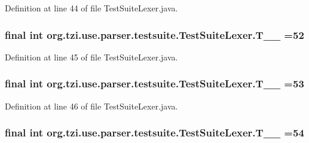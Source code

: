 Definition at line 44 of file Test\-Suite\-Lexer.\-java.

\hypertarget{classorg_1_1tzi_1_1use_1_1parser_1_1testsuite_1_1_test_suite_lexer_a5c9d36594806842d4b5cd9e8eb81f280}{
\subsubsection[{T\-\_\-\-\_\-52}]{\setlength{\rightskip}{0pt plus 5cm}final int org.\-tzi.\-use.\-parser.\-testsuite.\-Test\-Suite\-Lexer.\-T\-\_\-\-\_ =52\hspace{0.3cm}{\ttfamily [static]}}}\label{classorg_1_1tzi_1_1use_1_1parser_1_1testsuite_1_1_test_suite_lexer_a5c9d36594806842d4b5cd9e8eb81f280}


Definition at line 45 of file Test\-Suite\-Lexer.\-java.

\hypertarget{classorg_1_1tzi_1_1use_1_1parser_1_1testsuite_1_1_test_suite_lexer_a2456acf93faa5343583386230d8e002f}{
\subsubsection[{T\-\_\-\-\_\-53}]{\setlength{\rightskip}{0pt plus 5cm}final int org.\-tzi.\-use.\-parser.\-testsuite.\-Test\-Suite\-Lexer.\-T\-\_\-\-\_ =53\hspace{0.3cm}{\ttfamily [static]}}}\label{classorg_1_1tzi_1_1use_1_1parser_1_1testsuite_1_1_test_suite_lexer_a2456acf93faa5343583386230d8e002f}


Definition at line 46 of file Test\-Suite\-Lexer.\-java.

\hypertarget{classorg_1_1tzi_1_1use_1_1parser_1_1testsuite_1_1_test_suite_lexer_a6c77c978c88e20bfd6eb0b6ae324314b}{
\subsubsection[{T\-\_\-\-\_\-54}]{\setlength{\rightskip}{0pt plus 5cm}final int org.\-tzi.\-use.\-parser.\-testsuite.\-Test\-Suite\-Lexer.\-T\-\_\-\-\_ =54\hspace{0.3cm}{\ttfamily [static]}}}\label{classorg_1_1tzi_1_1use_1_1parser_1_1testsuite_1_1_test_suite_lexer_a6c77c978c88e20bfd6eb0b6ae324314b}


